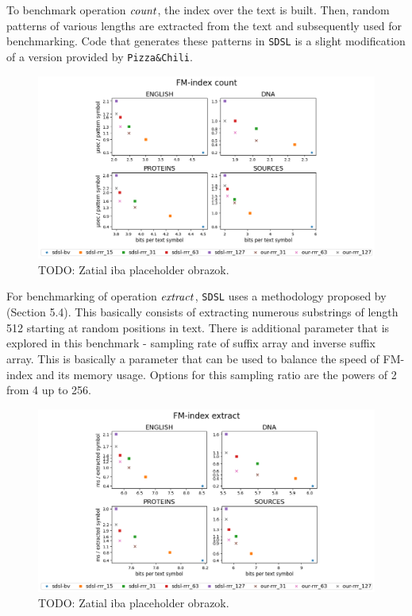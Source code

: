 To benchmark operation $\mathit{count}$, the index over the text is built. Then, random patterns of
various lengths are extracted from the text and subsequently used for benchmarking. Code
that generates these patterns in \texttt{SDSL} is a slight modification of a version provided
by \texttt{Pizza\&Chili}.

\begin{figure}
	\centerline{
		\includegraphics[width=\textwidth, height=0.35\textheight]{images/vysledky_sdsl_count}
	}
	\caption[TODO]{TODO: Zatial iba placeholder obrazok.
	}
	\label{obr:benchmark_sdsl_count}
\end{figure}

For benchmarking of operation $\mathit{extract}$, \texttt{SDSL} uses a methodology proposed by
\cite{ferragina2009compressed} (Section 5.4). This basically consists of extracting numerous
substrings of length 512 starting at random positions in text. There is additional parameter
that is explored in this benchmark - sampling rate of suffix array and inverse suffix array.
This is basically a parameter that can be used to balance the speed of FM-index and its memory
usage. Options for this sampling ratio are the powers of 2 from 4 up to 256. 

\begin{figure}
	\centerline{
		\includegraphics[width=\textwidth, height=0.35\textheight]{images/vysledky_sdsl_extract}
	}
	\caption[TODO]{TODO: Zatial iba placeholder obrazok.
	}
	\label{obr:benchmark_sdsl_extract}
\end{figure}

